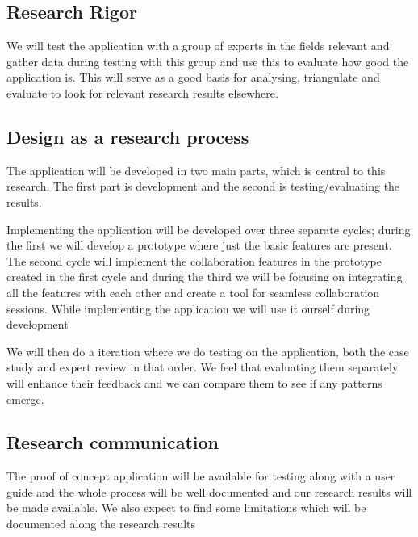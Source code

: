\subsection{Research Rigor}
 We will test the application with a group of experts in the fields relevant and gather data during testing with this group and use this to evaluate how good the application is. This will serve as a good basis for analysing, triangulate and evaluate to look for relevant research results elsewhere.
\subsection{Design as a research process}
The application will be developed in two main parts, which is central to this research. The first part is development and the second is testing/evaluating the results.

Implementing the application will be developed over three separate cycles; during the first we will develop a prototype where just the basic features are present. The second cycle will implement the collaboration features in the prototype created in the first cycle and during the third we will be focusing on integrating all the features with each other and create a tool for seamless collaboration sessions. While implementing the application we will use it ourself during development

We will then do a iteration where we do testing on the application, both the case study and expert review in that order. We feel that evaluating them separately will enhance their feedback and we can compare them to see if any patterns emerge.
\subsection{Research communication}
The proof of concept application will be available for testing along with a user guide and the whole process will be well documented and our research results will be made available.
We also expect to find some limitations which will be documented along the research results